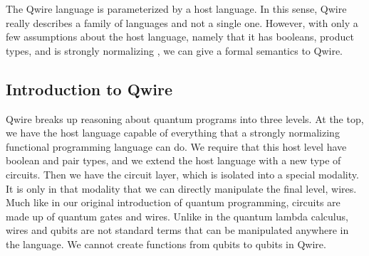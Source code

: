 The Qwire language is parameterized by a host language.
In this sense, Qwire really describes a family of languages and not a single one.
However, with only a few assumptions about the host language, namely that it has booleans, product types, and is strongly normalizing , we can give a formal semantics to Qwire.

\subsection{Introduction to Qwire}

Qwire breaks up reasoning about quantum programs into three levels.
At the top, we have the host language capable of everything that a strongly normalizing functional programming language can do.
We require that this host level have boolean and pair types, and we extend the host language with a new type of circuits.
Then we have the circuit layer, which is isolated into a special modality.
It is only in that modality that we can directly manipulate the final level, wires.
Much like in our original introduction of quantum programming, circuits are made up of quantum gates and wires.
Unlike in the quantum lambda calculus, wires and qubits are not standard terms that can be manipulated anywhere in the language.
We cannot create functions from qubits to qubits in Qwire.


